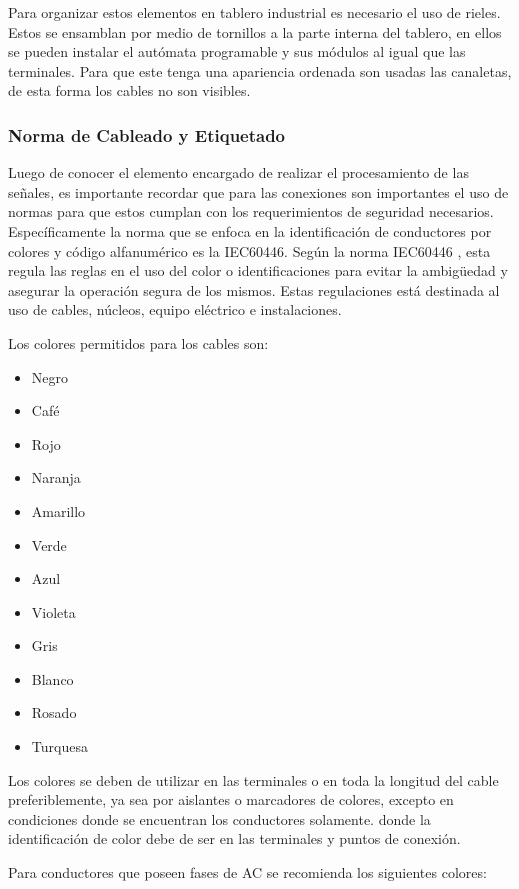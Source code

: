 Para organizar estos elementos en tablero industrial es necesario el uso de rieles. Estos se ensamblan por medio de tornillos a la parte interna del tablero, en ellos se pueden instalar el autómata programable y sus módulos al igual que las terminales. Para que este tenga una apariencia ordenada son usadas las canaletas, de esta forma los cables no son visibles.


\subsubsection{Norma de Cableado y Etiquetado}
Luego de conocer el elemento encargado de realizar el procesamiento de las señales, es importante recordar que para las conexiones son importantes el uso de normas para que estos cumplan con los requerimientos de seguridad necesarios. Específicamente la norma que se enfoca en la identificación de conductores por colores y código alfanumérico  es la IEC60446. Según la norma IEC60446 \cite{IEC:60446:2007}, esta regula las reglas en el uso del color o identificaciones para evitar la ambigüedad y asegurar la operación segura de los mismos. Estas regulaciones está destinada al uso de cables, núcleos, equipo eléctrico e instalaciones. 

Los colores permitidos para los cables son:

\begin{itemize}
  \item Negro
  \item Café
  \item Rojo
  \item Naranja
  \item Amarillo
  \item Verde
  \item Azul
  \item Violeta
  \item Gris
  \item Blanco
  \item Rosado
  \item Turquesa
  \end{itemize}
  
  Los colores se deben de utilizar en las terminales o en toda la longitud del cable preferiblemente, ya sea por aislantes o marcadores de colores, excepto en condiciones donde se encuentran los conductores solamente. donde la identificación de color debe de ser en las terminales y puntos de conexión.
  
  Para conductores que poseen fases de AC se recomienda los siguientes colores:
  

